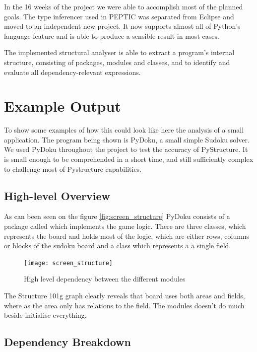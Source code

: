 \documentclass[12pt,halfparskip,DIV11,BCOR10mm]{scrreprt}
\begin{document}
In the 16 weeks of the project we were able to accomplish most of the planned goals. The type inferencer used in PEPTIC\cite{peptic2} was separated from Eclipse and moved to an independent new project. It now supports almost all of Python's language feature and is able to produce a sensible result in most cases. 

The implemented structural analyser is able to extract a program's internal structure, consisting of packages, modules and classes, and to identify and evaluate all dependency-relevant expressions.

\section{Example Output}

To show some examples of how this could look like here the analysis of a small application. The program being shown is PyDoku, a small simple Sudoku solver. We used PyDoku throughout the project to test the accuracy of PyStructure. It is small enough to be comprehended  in a short time, and still sufficiently complex to challenge most of Pystructure capabilities. 

\subsection{High-level Overview}

As can been seen on the figure \vref{fig:screen_structure} PyDoku consists of a package called  which implements the game logic. There are three classes,  which represents the board and holds most of the logic,  which are either rows, columns or blocks of the sudoku board and a class  which represents a a single field. 

\begin{figure}[H]
    \centering
    \texttt{[image: screen\_structure]}
    \caption{High level dependency between the different modules}
    \label{fig:screen_structure}
\end{figure}

The Structure 101g graph clearly reveals that board uses both areas and fields, where as the area only has relations to the field. The  modules doesn't do much beside initialise everything. 

\subsection{Dependency Breakdown}
\end{document}
